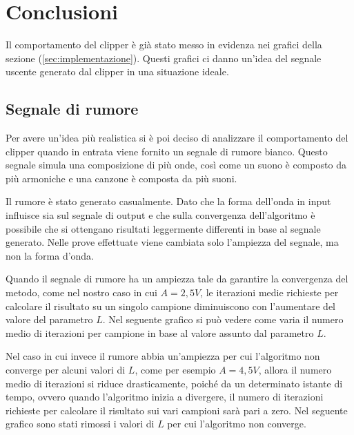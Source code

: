 \chapter{Conclusioni}
	Il comportamento del clipper è già stato messo in evidenza nei grafici della sezione (\ref{sec:implementazione}). Questi grafici ci danno un'idea del segnale uscente generato dal clipper in una situazione ideale.
	
	\section{Segnale di rumore}
		Per avere un'idea più realistica si è poi deciso di analizzare il comportamento del clipper quando in entrata viene fornito un segnale di rumore bianco. Questo segnale simula una composizione di più onde, così come un suono è composto da più armoniche e una canzone è composta da più suoni.
	
		Il rumore è stato generato casualmente. Dato che la forma dell'onda in input influisce sia sul segnale di output e che sulla convergenza dell'algoritmo è possibile che si ottengano risultati leggermente differenti in base al segnale generato. Nelle prove effettuate viene cambiata solo l'ampiezza del segnale, ma non la forma d'onda. %
	
		\graficospace
	
		Quando il segnale di rumore ha un ampiezza tale da garantire la convergenza del metodo, come nel nostro caso in cui $A = 2,5V$, le iterazioni medie richieste per calcolare il risultato su un singolo campione diminuiscono con l'aumentare del valore del parametro $L$. Nel seguente grafico si può vedere come varia il numero medio di iterazioni per campione in base al valore assunto dal parametro $L$.
	
		\pagebreak
	
		Nel caso in cui invece il rumore abbia un'ampiezza per cui l'algoritmo non converge per alcuni valori di $L$, come per esempio $A = 4,5V$, allora il numero medio di iterazioni si riduce drasticamente, poiché da un determinato istante di tempo, ovvero quando l'algoritmo inizia a divergere, il numero di iterazioni richieste per calcolare il risultato sui vari campioni sarà pari a zero. Nel seguente grafico sono stati rimossi i valori di $L$ per cui l'algoritmo non converge.
	
